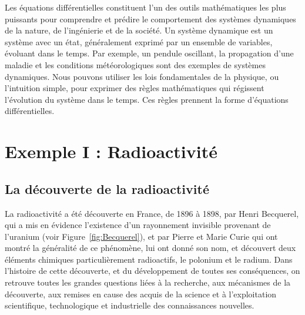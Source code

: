 \documentclass[%
oneside,                 %
final,                   %
10pt]{article}
\begin{document}
Les équations différentielles constituent l'un des outils mathématiques les plus puissants pour comprendre et prédire le comportement des systèmes dynamiques de la nature, de l'ingénierie et de la société. Un système dynamique est un système avec un état, généralement exprimé par un ensemble de variables, évoluant dans le temps. Par exemple, un pendule oscillant, la propagation d'une maladie et les conditions météorologiques sont des exemples de systèmes dynamiques. Nous pouvons utiliser les lois fondamentales de la physique, ou l'intuition simple, pour exprimer des règles mathématiques qui régissent l'évolution du système dans le temps. Ces règles prennent la forme d'équations différentielles.


\section{Exemple I : Radioactivité}
\subsection{La découverte de la radioactivité}
La radioactivité a été découverte en France, de 1896 à 1898, par Henri Becquerel, qui a mis en évidence l’existence d’un rayonnement invisible provenant de l’uranium (voir Figure~\ref{fig:Becquerel}), et par Pierre et Marie Curie qui ont montré la généralité de ce phénomène, lui ont donné son nom, et découvert deux éléments chimiques particulièrement radioactifs, le polonium et le radium. Dans l’histoire de cette découverte, et du développement de toutes ses conséquences, on retrouve toutes les grandes questions liées à la recherche, aux mécanismes de la découverte, aux remises en cause des acquis de la science et à l’exploitation scientifique, technologique et industrielle des connaissances nouvelles.
\end{document}
